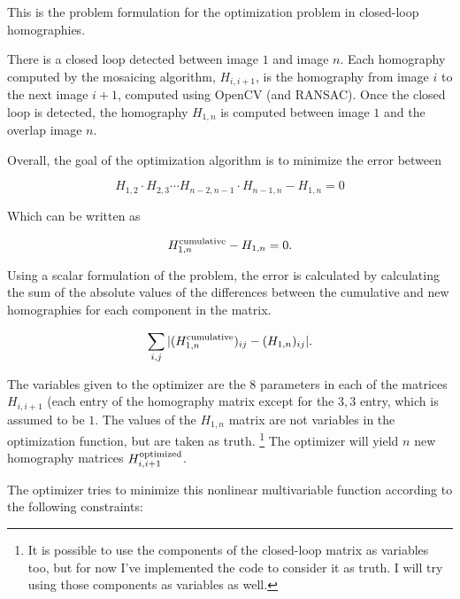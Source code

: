 \documentclass{article}
\begin{document}
 

This is the problem formulation for the optimization problem in closed-loop
homographies.

There is a closed loop detected between image $1$ and image $n$. Each
homography computed by the mosaicing algorithm, $H_{i, i + 1}$, is the
homography from image $i$ to the next image $i + 1$, computed using OpenCV (and
RANSAC). Once the closed loop is detected, the homography $H_{1, n}$ is
computed between image $1$ and the overlap image $n$. 

Overall, the goal of the optimization algorithm is to minimize the error
between
 
\[H_{1, 2} \cdot H_{2, 3} \cdots H_{n - 2, n - 1} \cdot H_{n - 1, n} - H_{1, n} = 0\]

Which can be written as

\[H_{1, n}^{\textnormal{cumulative}} - H_{1, n} = 0.\]

Using a scalar formulation of the problem, the error is calculated by
calculating the sum of the absolute values of the differences between the
cumulative and new homographies for each component in the matrix.

\[\sum_{i,j} |(H_{1, n}^{\textnormal{cumulative}})_{ij} - (H_{1, n})_{ij}|.\]

The variables given to the optimizer are the $8$ parameters in each of the
matrices $H_{i, i + 1}$ (each entry of the homography matrix except for the $3,
3$ entry, which is assumed to be $1$. The values of the $H_{1, n}$ matrix are
not variables in the optimization function, but are taken as truth.
\footnote{It is possible to use the components of the closed-loop matrix as
variables too, but for now I've implemented the code to consider it as truth. I
will try using those components as variables as well.} The optimizer will yield
$n$ new homography matrices $H_{i, i+1}^{\textnormal{optimized}}$. 

The optimizer tries to minimize this nonlinear multivariable function according
to the following constraints:
\end{document}

